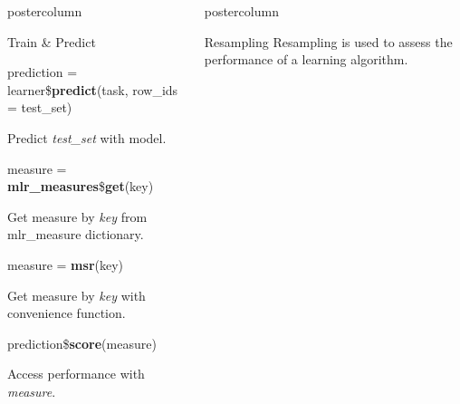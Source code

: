 \documentclass{beamer}
\newlength{\columnheight} %
\begin{document}
\begin{frame}[fragile]{}
\begin{columns}
\begin{column}{.245\textwidth}
\begin{beamercolorbox}[center]{postercolumn}
\begin{minipage}{.98\textwidth}
{\begin{myblock}{Train \& Predict}
\begin{codebox}
						prediction = learner\$\textbf{predict}(task, row\_ids = test\_set)
					\end{codebox}
					Predict \textit{test\_set} with model.
					\\
					\begin{codebox}
						measure = \textbf{mlr\_measures}\$\textbf{get}(key)
					\end{codebox}
					Get measure by \textit{key} from mlr\_measure dictionary.
					\\
					\begin{codebox}
						measure = \textbf{msr}(key)
					\end{codebox}
					Get measure by \textit{key} with convenience function.
					\\
					\begin{codebox}
						prediction\$\textbf{score}(measure)
					\end{codebox}
					Access performance with \textit{measure}.
				\end{myblock}
										}
			\end{minipage}
		\end{beamercolorbox}
	\end{column}
		\begin{column}{.245\textwidth}
		  \begin{beamercolorbox}[center]{postercolumn}
			   \begin{minipage}{.98\textwidth}
				  \parbox[t][\columnheight]{\textwidth}{
					  \begin{myblock}{Resampling}
						  Resampling is used to assess the performance of a learning algorithm.
						  \\[\baselineskip]
						    \begin{minipage}{\textwidth}
							    \begin{columns}[T]
								    \begin{column}{0.2\textwidth}

\end{column}
\end{columns}
\end{minipage}
\end{myblock}}
\end{minipage}
\end{beamercolorbox}
\end{column}
\end{columns}
\end{frame}
\end{document}
